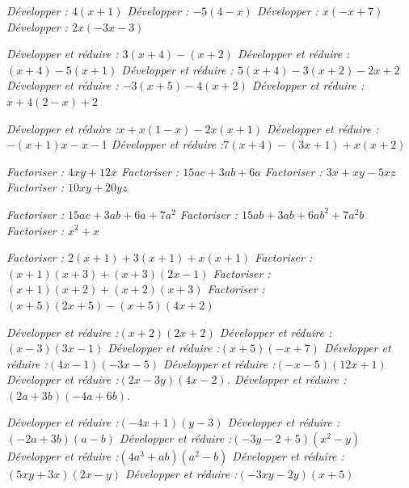   
  
  \if{} \it Développer : $4(x+1)$ \fi
  \if{} \it Développer : $-5(4-x)$\fi
  \if{} \it Développer : $x(-x+7)$\fi
  \if{} \it Développer : $2x(-3x-3)$\fi
  
  
 \if{} \it Développer et réduire : $3(x+4) - (x+2)$\fi
 \if{} \it  Développer et réduire : $(x+4) -5( x+1)$\fi
 \if{} \it  Développer et réduire : $5(x+4) - 3(x+2) - 2x + 2$\fi
 \if{} \it  Développer et réduire : $-3(x+5)-4(x+2)$ \fi
 \if{} \it  Développer et réduire : $x+4(2-x)+2$\fi
 
 
  \if{} \it Développer et réduire :$x+x(1 - x) - 2x(x+1) $\fi
  \if{} \it Développer et réduire :$-(x+1)x - x - 1$ \fi
  \if{} \it Développer et réduire :$7(x+4)- (3x+1) + x(x+2)$\fi
  
  
  
  \if{}  \it Factoriser : $4xy + 12x$\fi 
  \if{} \it Factoriser :  $15ac + 3ab + 6a$\fi
 \if{}  \it Factoriser : $3x+xy - 5xz$\fi
  \if{} \it Factoriser :  $10xy + 20yz$\fi


 \if{} \it  Factoriser : $15ac + 3ab + 6a+ 7a^2$\fi
 \if{} \it Factoriser : $15ab + 3ab + 6ab^2+ 7a^2b$\fi
 \if{} \it Factoriser : $x^2 + x$\fi


\if{} \it Factoriser : $2(x+1) + 3(x+1) + x(x+1)$\fi
\if{} \it Factoriser : $(x+1)(x+3)+(x+3)(2x-1)$\fi
\if{}  \it Factoriser : $(x+1)(x+2) + (x+2)(x+3)$\fi
\if{} \it Factoriser : $(x+5)(2x+5) - (x+5)(4x+2)$\fi




\if{}  \it Développer et réduire :$(x+2)(2x+2)$\fi
\if{}  \it Développer et réduire :$(x-3)(3x-1)$\fi
\if{}  \it Développer et réduire :$(x+5)(-x+7)$\fi
\if{}  \it Développer et réduire :$(4x-1)(-3x-5)$\fi
\if{}  \it Développer et réduire :$(-x-5)(12x+1)$\fi
\if{} \it Développer et réduire :$(2x-3y)(4x-2)$.\fi
\if{} \it Développer et réduire :$(2a+3b)(-4a+6b)$.\fi

\if{} \it Développer et réduire :$(-4x+1)(y-3)$\fi
\if{} \it Développer et réduire :$(-2a+3b)(a-b)$\fi
\if{} \it Développer et réduire :$(-3y-2+5)(x^2-y)$\fi
\if{} \it Développer et réduire :$(4a^3+ab)(a^2-b)$\fi
\if{} \it Développer et réduire :$(5xy+3x)(2x-y)$\fi
\if{} \it Développer et réduire :$(-3xy-2y)(x+5)$\fi


